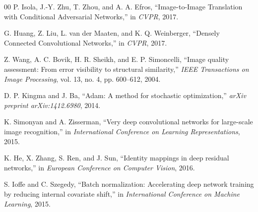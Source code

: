 \documentclass[conference]{IEEEtran}
\begin{document}
\begin{thebibliography}{00}
 P. Isola, J.-Y. Zhu, T. Zhou, and A. A. Efros, ``Image-to-Image Translation with Conditional Adversarial Networks,'' in \emph{CVPR}, 2017.

 G. Huang, Z. Liu, L. van der Maaten, and K. Q. Weinberger, ``Densely Connected Convolutional Networks,'' in \emph{CVPR}, 2017.

 Z. Wang, A. C. Bovik, H. R. Sheikh, and E. P. Simoncelli, ``Image quality assessment: From error visibility to structural similarity,'' \emph{IEEE Transactions on Image Processing}, vol. 13, no. 4, pp. 600--612, 2004.

 D. P. Kingma and J. Ba, ``Adam: A method for stochastic optimization,'' \emph{arXiv preprint arXiv:1412.6980}, 2014.

 K. Simonyan and A. Zisserman, ``Very deep convolutional networks for large-scale image recognition,'' in \emph{International Conference on Learning Representations}, 2015.

 K. He, X. Zhang, S. Ren, and J. Sun, ``Identity mappings in deep residual networks,'' in \emph{European Conference on Computer Vision}, 2016.

 S. Ioffe and C. Szegedy, ``Batch normalization: Accelerating deep network training by reducing internal covariate shift,'' in \emph{International Conference on Machine Learning}, 2015.

\end{thebibliography}
\end{document}
